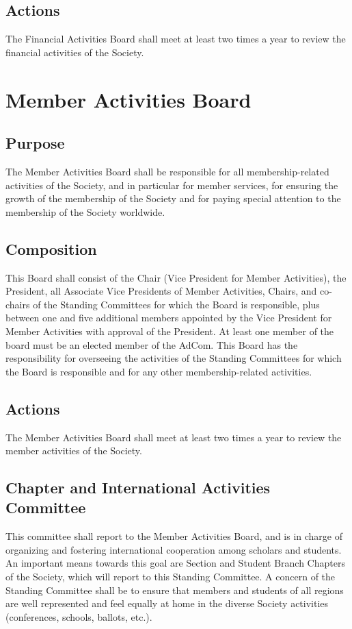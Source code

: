 \documentclass[10pt]{article}
\begin{document}
\subsection{Actions}
The Financial Activities Board shall meet at least two times a year to review the financial activities of the Society. 


\section{Member Activities Board}
\label{MAB}
\subsection{Purpose}
The Member Activities Board shall be responsible for all membership-related activities of the Society, and in particular for member services, for ensuring the growth of the membership of the Society and for paying special attention to the membership of the Society worldwide.

\subsection{Composition}
This Board shall consist of the Chair (Vice President for Member Activities), the President, all Associate Vice Presidents of Member Activities, Chairs, and co-chairs of the Standing Committees for which the Board is responsible, plus between one and five additional members appointed by the Vice President for Member Activities with approval of the President. At least one member of the board must be an elected member of the AdCom. This Board has the responsibility for overseeing the activities of the Standing Committees for which the Board is responsible and for any other membership-related activities.


\subsection{Actions}
The Member Activities Board shall meet at least two times a year to review the member activities of the Society.


\subsection{Chapter and International Activities Committee}

This committee shall report to the Member Activities Board, and is in charge of organizing and fostering international cooperation among scholars and students. An important means towards this goal are Section and Student Branch Chapters of the Society, which will report to this Standing Committee.  A concern of the Standing Committee shall be to ensure that members and students of all regions are well represented and feel equally at home in the diverse Society activities (conferences, schools, ballots, etc.).
\end{document}
